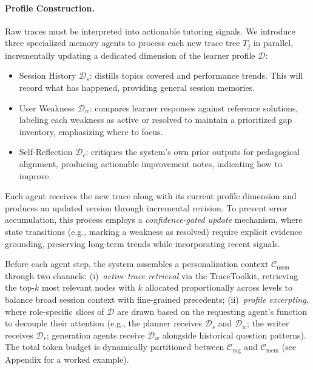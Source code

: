 \paragraph{Profile Construction.}
\label{sec:injection}
Raw traces must be interpreted into actionable tutoring signals.
We introduce three specialized memory agents to process each new trace tree $T_j$ in parallel, incrementally updating a dedicated dimension of the learner profile $\mathcal{D}$:
\begin{itemize}[nosep,leftmargin=*]
\item Session History $ \mathcal{D}_s$: distills topics covered and performance trends. This will record what has happened, providing general session memories.
\item User Weakness $\mathcal{D}_w$: compares learner responses against reference solutions, labeling each weakness as active or resolved to maintain a prioritized gap inventory, emphasizing where to focus.
\item Self-Reflection $\mathcal{D}_r$: critiques the system's own prior outputs for pedagogical alignment, producing actionable improvement notes, indicating how to improve.
\end{itemize}
Each agent receives the new trace along with its current profile dimension and produces an updated version through incremental revision. To prevent error accumulation, this process employs a \textit{confidence-gated update} mechanism, where state transitions (e.g., marking a weakness as resolved) require explicit evidence grounding, preserving long-term trends while incorporating recent signals.

Before each agent step, the system assembles a personalization context $\mathcal{C}_{\text{mem}}$ through two channels:
(i)~\emph{active trace retrieval} via the TraceToolkit, retrieving the top-$k$ most relevant nodes with $k$ allocated proportionally across levels to balance broad session context with fine-grained precedents;
(ii)~\emph{profile excerpting}, where role-specific slices of $\mathcal{D}$ are drawn based on the requesting agent's function to decouple their attention (e.g., the planner receives $\mathcal{D}_s$ and $\mathcal{D}_w$; the writer receives $\mathcal{D}_r$; generation agents receive $\mathcal{D}_w$ alongside historical question patterns). The total token budget is dynamically partitioned between $\mathcal{C}_{\text{rag}}$ and $\mathcal{C}_{\text{mem}}$ (see Appendix for a worked example).

